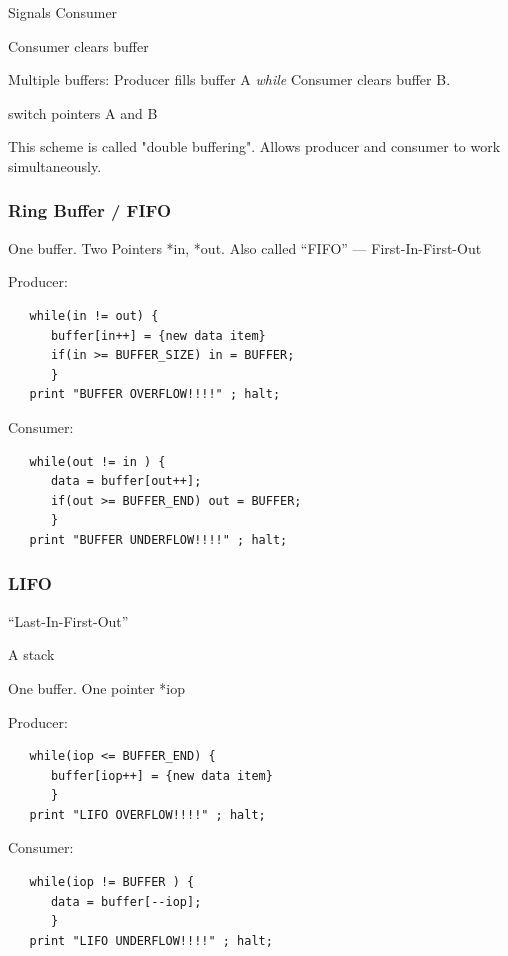 Signals Consumer

Consumer clears buffer

Multiple buffers:  Producer fills buffer A
{\it while} Consumer clears buffer B.

switch pointers A and B

This scheme is called "double buffering".  Allows producer and
consumer to work simultaneously.

\subsubsection{Ring Buffer / FIFO}

One buffer.    Two Pointers *in, *out.
 Also called ``FIFO'' --- First-In-First-Out	%

Producer:
\begin{verbatim}
   while(in != out) {
      buffer[in++] = {new data item}
      if(in >= BUFFER_SIZE) in = BUFFER;
      }
   print "BUFFER OVERFLOW!!!!" ; halt;
\end{verbatim}
Consumer:
\begin{verbatim}
   while(out != in ) {
      data = buffer[out++];
      if(out >= BUFFER_END) out = BUFFER;
      }
   print "BUFFER UNDERFLOW!!!!" ; halt;
\end{verbatim}



\subsubsection{LIFO}
``Last-In-First-Out''

A stack

One buffer.  One pointer *iop

Producer:
\begin{verbatim}
   while(iop <= BUFFER_END) {
      buffer[iop++] = {new data item}
      }
   print "LIFO OVERFLOW!!!!" ; halt;
\end{verbatim}
Consumer:

\begin{verbatim}
   while(iop != BUFFER ) {
      data = buffer[--iop];
      }
   print "LIFO UNDERFLOW!!!!" ; halt;
\end{verbatim}



